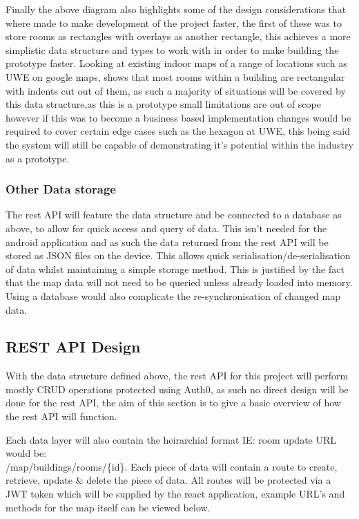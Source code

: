 Finally the above diagram also highlights some of the design considerations that where made to make development of the project faster, the first of these was to store rooms as rectangles with overlays as another rectangle, this achieves a more simplistic data structure and types to work with in order to make building the prototype faster. Looking at existing indoor maps of a range of locations such as UWE on google maps, shows that most rooms within a building are rectangular with indents cut out of them, as such a majority of situations will be covered by this data structure,as this is a prototype small limitations are out of scope however if this was to become a business based implementation changes would be required to cover certain edge cases such as the hexagon at UWE, this being said the system will still be capable of demonstrating it's potential within the industry as a prototype.

\subsubsection{Other Data storage}
The rest API will feature the data structure and be connected to a database as above, to allow for quick access and query of data. This isn't needed for the android application and as such the data returned from the rest API will be stored as JSON files on the device. This allows quick serialisation/de-serialisation of data whilst maintaining a simple storage method. This is justified by the fact that the map data will not need to be queried unless already loaded into memory. Using a database would also complicate the re-synchronisation of changed map data.

\newpage
\subsection{REST API Design}
With the data structure defined above, the rest API for this project will perform mostly CRUD operations protected using Auth0, as such no direct design will be done for the rest API, the aim of this section is to give a basic overview of how the rest API will function.

Each data layer will also contain the heirarchial format IE: room update URL would be:\\ /map/buildings/rooms/\{id\}. Each piece of data will contain a route to create, retrieve, update \& delete the piece of data. All routes will be protected via a JWT token which will be supplied by the react application, example URL's and methods for the map itself can be viewed below.

